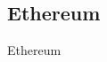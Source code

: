 \subsection{Ethereum\label{methods}}
\begin{otherlanguage}{english}

Ethereum \cite{buterin2017ethereum}

\end{otherlanguage}